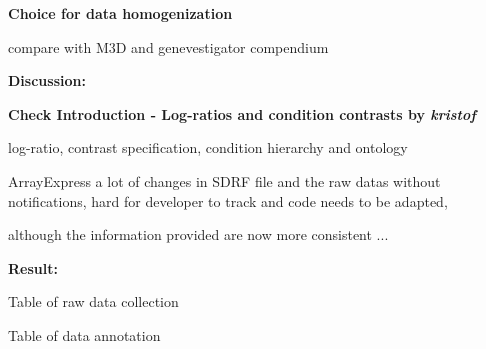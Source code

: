 \textbf{Choice for data homogenization}





compare with M3D and genevestigator compendium

\textbf{Discussion: }

\textbf{Check Introduction - Log-ratios and condition contrasts by 
\textit{kristof}}

log-ratio, contrast specification, condition hierarchy and ontology



ArrayExpress a lot of changes in SDRF file and the raw datas without
notifications, hard for developer to track and code needs to be adapted,

although the information provided are now more consistent ...


\textbf{Result: }

Table of raw data collection

Table of data annotation





\cleardoublepage


